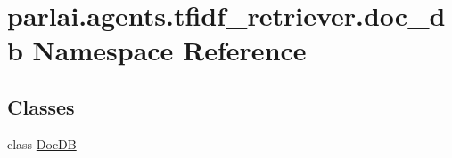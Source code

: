 \hypertarget{namespaceparlai_1_1agents_1_1tfidf__retriever_1_1doc__db}{}\section{parlai.\+agents.\+tfidf\+\_\+retriever.\+doc\+\_\+db Namespace Reference}
\label{namespaceparlai_1_1agents_1_1tfidf__retriever_1_1doc__db}
\subsection*{Classes}
\begin{DoxyCompactItemize}
\item 
class \hyperlink{classparlai_1_1agents_1_1tfidf__retriever_1_1doc__db_1_1DocDB}{Doc\+DB}
\end{DoxyCompactItemize}
